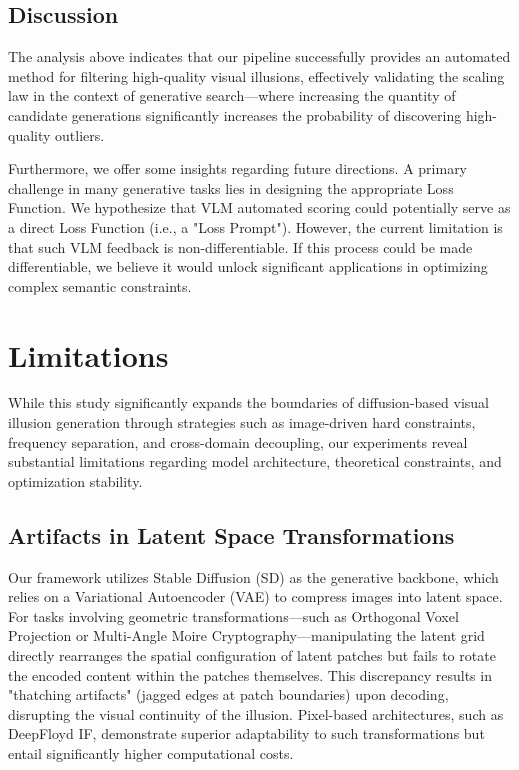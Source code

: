 \documentclass{article}
\begin{document}
\subsection{Discussion}
The analysis above indicates that our pipeline successfully provides an automated method for filtering high-quality visual illusions, effectively validating the scaling law in the context of generative search—where increasing the quantity of candidate generations significantly increases the probability of discovering high-quality outliers.

Furthermore, we offer some insights regarding future directions. A primary challenge in many generative tasks lies in designing the appropriate Loss Function. We hypothesize that VLM automated scoring could potentially serve as a direct Loss Function (i.e., a "Loss Prompt"). However, the current limitation is that such VLM feedback is non-differentiable. If this process could be made differentiable, we believe it would unlock significant applications in optimizing complex semantic constraints.

\section{Limitations}

While this study significantly expands the boundaries of diffusion-based visual illusion generation through strategies such as image-driven hard constraints, frequency separation, and cross-domain decoupling, our experiments reveal substantial limitations regarding model architecture, theoretical constraints, and optimization stability.

\subsection{Artifacts in Latent Space Transformations}
Our framework utilizes Stable Diffusion (SD) as the generative backbone, which relies on a Variational Autoencoder (VAE) to compress images into latent space. For tasks involving geometric transformations—such as Orthogonal Voxel Projection or Multi-Angle Moire Cryptography—manipulating the latent grid directly rearranges the spatial configuration of latent patches but fails to rotate the encoded content within the patches themselves. This discrepancy results in "thatching artifacts" (jagged edges at patch boundaries) upon decoding, disrupting the visual continuity of the illusion. Pixel-based architectures, such as DeepFloyd IF, demonstrate superior adaptability to such transformations but entail significantly higher computational costs.
\end{document}
